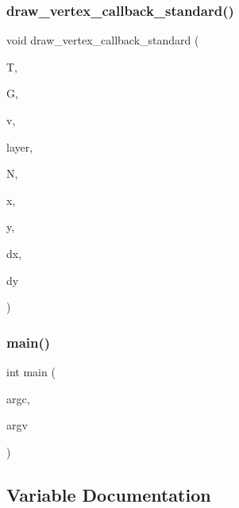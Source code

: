 \subsubsection{\texorpdfstring{draw\+\_\+vertex\+\_\+callback\+\_\+standard()}{draw\_vertex\_callback\_standard()}}
{\footnotesize\ttfamily void draw\+\_\+vertex\+\_\+callback\+\_\+standard (\begin{DoxyParamCaption}\item[{\mbox{\hyperlink{classtree}{tree}} $\ast$}]{T,  }\item[{\mbox{\hyperlink{classmp__graphics}{mp\+\_\+graphics}} $\ast$}]{G,  }\item[{\mbox{\hyperlink{galois_8h_a09fddde158a3a20bd2dcadb609de11dc}{I\+NT}} $\ast$}]{v,  }\item[{\mbox{\hyperlink{galois_8h_a09fddde158a3a20bd2dcadb609de11dc}{I\+NT}}}]{layer,  }\item[{\mbox{\hyperlink{classtree__node}{tree\+\_\+node}} $\ast$}]{N,  }\item[{\mbox{\hyperlink{galois_8h_a09fddde158a3a20bd2dcadb609de11dc}{I\+NT}}}]{x,  }\item[{\mbox{\hyperlink{galois_8h_a09fddde158a3a20bd2dcadb609de11dc}{I\+NT}}}]{y,  }\item[{\mbox{\hyperlink{galois_8h_a09fddde158a3a20bd2dcadb609de11dc}{I\+NT}}}]{dx,  }\item[{\mbox{\hyperlink{galois_8h_a09fddde158a3a20bd2dcadb609de11dc}{I\+NT}}}]{dy }\end{DoxyParamCaption})}

\mbox{\label{treedraw_8_c_a217dbf8b442f20279ea00b898af96f52}} 
\subsubsection{\texorpdfstring{main()}{main()}}
{\footnotesize\ttfamily int main (\begin{DoxyParamCaption}\item[{int}]{argc,  }\item[{const char $\ast$$\ast$}]{argv }\end{DoxyParamCaption})}



\subsection{Variable Documentation}
\mbox{\label{treedraw_8_c_a11520bfff076f76482f7f88c0952cf44}} 
